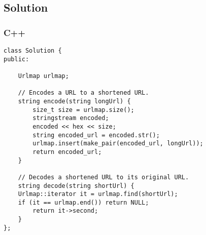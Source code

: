 \newpage

\subsection*{Solution}
\subsubsection*{C++}
\begin{verbatim}
class Solution {
public:

    Urlmap urlmap;
    
    // Encodes a URL to a shortened URL.
    string encode(string longUrl) {
        size_t size = urlmap.size();
        stringstream encoded;
        encoded << hex << size;
        string encoded_url = encoded.str();
        urlmap.insert(make_pair(encoded_url, longUrl));
        return encoded_url;
    }
    
    // Decodes a shortened URL to its original URL.
    string decode(string shortUrl) {
    Urlmap::iterator it = urlmap.find(shortUrl);
    if (it == urlmap.end()) return NULL;
        return it->second;
    }
};
\end{verbatim}

\newpage

